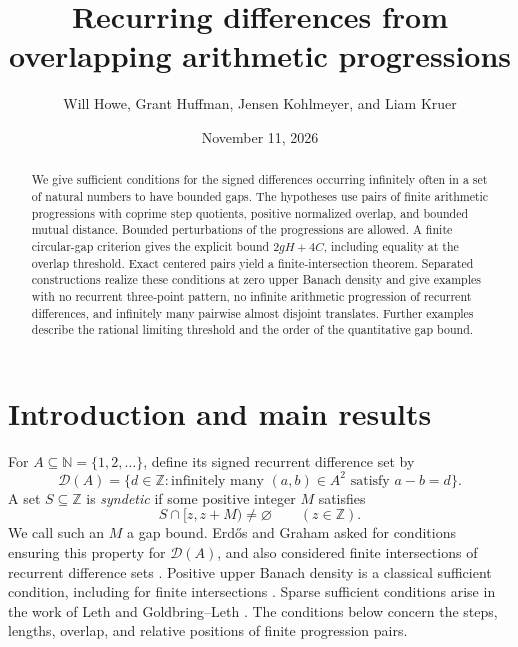 \documentclass[11pt,leqno]{amsart}
\title[Recurring differences]{Recurring differences from overlapping arithmetic progressions}
\author[W. Howe, G. Huffman, J. Kohlmeyer, and L. Kruer]{Will Howe, Grant Huffman, Jensen Kohlmeyer, and Liam Kruer}
\date{November 11, 2026}
\numberwithin{equation}{section}
\theoremstyle{definition}
\theoremstyle{remark}
\newcommand{\N}{\mathbb N}
\newcommand{\Z}{\mathbb Z}
\newcommand{\D}{\mathcal D}
\begin{document}
\begin{abstract}
We give sufficient conditions for the signed differences occurring infinitely often in a set of natural numbers to have bounded gaps. The hypotheses use pairs of finite arithmetic progressions with coprime step quotients, positive normalized overlap, and bounded mutual distance. Bounded perturbations of the progressions are allowed. A finite circular-gap criterion gives the explicit bound $2gH+4C$, including equality at the overlap threshold. Exact centered pairs yield a finite-intersection theorem. Separated constructions realize these conditions at zero upper Banach density and give examples with no recurrent three-point pattern, no infinite arithmetic progression of recurrent differences, and infinitely many pairwise almost disjoint translates. Further examples describe the rational limiting threshold and the order of the quantitative gap bound.
\end{abstract}
\maketitle

\section{Introduction and main results}

For $A\subseteq\N=\{1,2,\ldots\}$, define its signed recurrent difference set by
\begin{equation}\label{eq:D}
\D(A)=\{d\in\Z:\text{infinitely many }(a,b)\in A^2\text{ satisfy }a-b=d\}.
\end{equation}
A set $S\subseteq\Z$ is \emph{syndetic} if some positive integer $M$ satisfies
\begin{equation}\label{eq:syndetic}
S\cap[z,z+M)\ne\varnothing\qquad(z\in\Z).
\end{equation}
We call such an $M$ a gap bound. Erd\H{o}s and Graham asked for conditions ensuring this property for $\D(A)$, and also considered finite intersections of recurrent difference sets \cite[p.~50]{EG}. Positive upper Banach density is a classical sufficient condition, including for finite intersections \cite{ST,Ruzsa}. Sparse sufficient conditions arise in the work of Leth and Goldbring--Leth \cite{Leth,GL}. The conditions below concern the steps, lengths, overlap, and relative positions of finite progression pairs.
\end{document}
